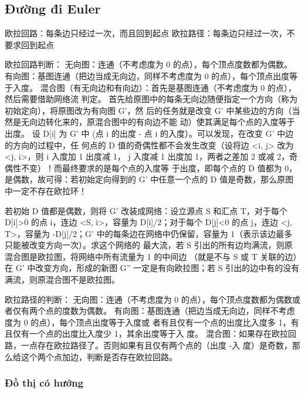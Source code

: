 \documentclass[11pt]{article}
\begin{document}
\subsection{Đường đi Euler}

\begin{Code}
     欧拉回路：每条边只经过一次，而且回到起点
     欧拉路径：每条边只经过一次，不要求回到起点

     欧拉回路判断：
     无向图：连通（不考虑度为 0 的点），每个顶点度数都为偶数。
     有向图：基图连通（把边当成无向边，同样不考虑度为 0 的点），每个顶点出度等于入度。
     混合图（有无向边和有向边）：首先是基图连通（不考虑度为 0 的点），然后需要借助网络流
     判定。
     首先给原图中的每条无向边随便指定一个方向（称为初始定向），将原图改为有向图 G’，然
     后的任务就是改变 G’ 中某些边的方向（当然是无向边转化来的，原混合图中的有向边不能
     动）使其满足每个点的入度等于出度。
     设 D[i] 为 G’ 中 (点 i 的出度 - 点 i 的入度）。可以发现，在改变 G’ 中边的方向的过程中，任
     何点的 D 值的奇偶性都不会发生改变（设将边 <i, j> 改为 <j, i>，则 i 入度加 1 出度减 1，
     j 入度减 1 出度加 1，两者之差加 2 或减 2，奇偶性不变）！而最终要求的是每个点的入度等
     于出度，即每个点的 D 值都为 0，是偶数，故可得：若初始定向得到的 G’ 中任意一个点的
     D 值是奇数，那么原图中一定不存在欧拉环！

     若初始 D 值都是偶数，则将 G’ 改装成网络：设立源点 S 和汇点 T，对于每个 D[i]>0 的点
     i，连边 <S, i>，容量为 D[i]/2；对于每个 D[j]<0 的点 j，连边 <j, T>，容量为 -D[j]/2；G’
     中的每条边在网络中仍保留，容量为 1（表示该边最多只能被改变方向一次）。求这个网络的
     最大流，若 S 引出的所有边均满流，则原混合图是欧拉图，将网络中所有流量为 1 的中间边
     （就是不与 S 或 T 关联的边）在 G’ 中改变方向，形成的新图 G” 一定是有向欧拉图；若 S
     引出的边中有的没有满流，则原混合图不是欧拉图。

     欧拉路径的判断：
     无向图：连通（不考虑度为 0 的点），每个顶点度数都为偶数或者仅有两个点的度数为偶数。
     有向图：基图连通（把边当成无向边，同样不考虑度为 0 的点），每个顶点出度等于入度或
     者有且仅有一个点的出度比入度多 1，有且仅有一个点的出度比入度少 1，其余出度等于入
     度。
     混合图：如果存在欧拉回路，一点存在欧拉路径了。否则如果有且仅有两个点的（出度 -入
     度）是奇数，那么给这个两个点加边，判断是否存在欧拉回路。
\end{Code}

\subsubsection{Đồ thị có hướng}
\end{document}

